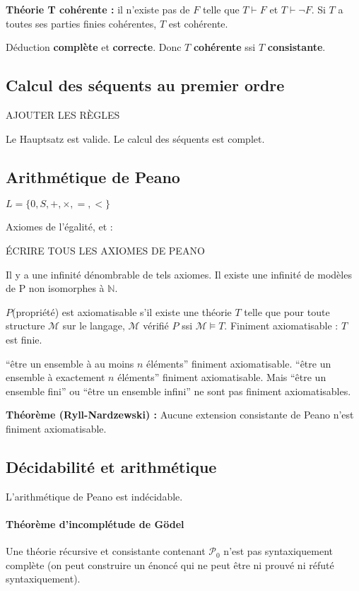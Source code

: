 \documentclass[french]{article}
\begin{document}
\textbf{Théorie T cohérente : }il n'existe pas de $F$ telle que $T\vdash F$ et $T\vdash\neg F$. Si $T$ a toutes ses parties finies cohérentes, $T$ est cohérente.

Déduction \textbf{complète} et \textbf{correcte}. Donc $T$ \textbf{cohérente} ssi $T$ \textbf{consistante}.

\subsection{Calcul des séquents au premier ordre}
AJOUTER LES RÈGLES

Le Hauptsatz est valide. Le calcul des séquents est complet.

\subsection{Arithmétique de Peano}
$L = \{0,S,+,\times,=,<\}$

Axiomes de l'égalité, et :

ÉCRIRE TOUS LES AXIOMES DE PEANO

Il y a une infinité dénombrable de tels axiomes. Il existe une infinité de modèles de P non isomorphes à $\mathbb{N}$.

$P$(propriété) est axiomatisable s'il existe une théorie $T$ telle que pour toute structure $\mathcal{M}$ sur le langage, $\mathcal{M}$ vérifié $P$ ssi $\mathcal{M}\models T$. Finiment axiomatisable : $T$ est finie.

``être un ensemble à au moins $n$ éléments'' finiment axiomatisable.
``être un ensemble à exactement $n$ éléments'' finiment axiomatisable.
Mais ``être un ensemble fini'' ou ``être un ensemble infini'' ne sont pas finiment axiomatisables.

\textbf{Théorème (Ryll-Nardzewski) :} Aucune extension consistante de Peano n'est finiment axiomatisable.

\subsection{Décidabilité et arithmétique}
L'arithmétique de Peano est indécidable.
\paragraph{Théorème d'incomplétude de Gödel} Une théorie récursive et consistante contenant $\mathcal{P}_0$ n'est pas syntaxiquement complète (on peut construire un énoncé qui ne peut être ni prouvé ni réfuté syntaxiquement).
\end{document}
